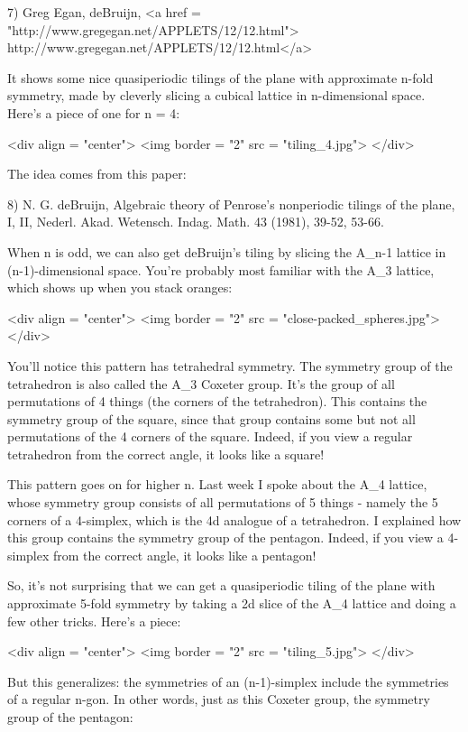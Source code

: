7) Greg Egan, deBruijn, 
<a href = "http://www.gregegan.net/APPLETS/12/12.html">
http://www.gregegan.net/APPLETS/12/12.html</a>

It shows some nice quasiperiodic tilings of the plane with approximate 
n-fold symmetry, made by cleverly slicing a cubical lattice in 
n-dimensional space.   Here's a piece of one for n = 4:

<div align = "center">
<img border = "2" src = "tiling_4.jpg">
</div>
 
The idea comes from this paper:

8) N. G. deBruijn, Algebraic theory of Penrose's nonperiodic tilings 
of the plane, I, II, Nederl. Akad. Wetensch. Indag. Math. 43 (1981),
39-52, 53-66. 

When n is odd, we can also get deBruijn's tiling by slicing the
A_{n-1} lattice in (n-1)-dimensional space.  You're probably
most familiar with the A_{3} lattice, which shows up when you
stack oranges:

<div align = "center">
<img border = "2" src = "close-packed_spheres.jpg">
</div>

You'll notice this pattern has tetrahedral symmetry.  The symmetry
group of the tetrahedron is also called the A_{3} Coxeter
group.  It's the group of all permutations of 4 things (the corners of
the tetrahedron).  This contains the symmetry group of the square,
since that group contains some but not all permutations of the 4
corners of the square.  Indeed, if you view a regular tetrahedron from
the correct angle, it looks like a square!

This pattern goes on for higher n.  Last week I spoke about the
A_{4} lattice, whose symmetry group consists of all
permutations of 5 things - namely the 5 corners of a 4-simplex, which
is the 4d analogue of a tetrahedron.  I explained how this group
contains the symmetry group of the pentagon.  Indeed, if you view a
4-simplex from the correct angle, it looks like a pentagon!

So, it's not surprising that we can get a quasiperiodic tiling of the plane
with approximate 5-fold symmetry by taking a 2d slice of the
A_{4} lattice and doing a few other tricks.  Here's a piece:

<div align = "center">
<img border = "2" src = "tiling_5.jpg">
</div>
 
But this generalizes: 
the symmetries of an (n-1)-simplex include the symmetries of a regular 
n-gon.   In other words, just as this Coxeter group, the symmetry 
group of the pentagon:

